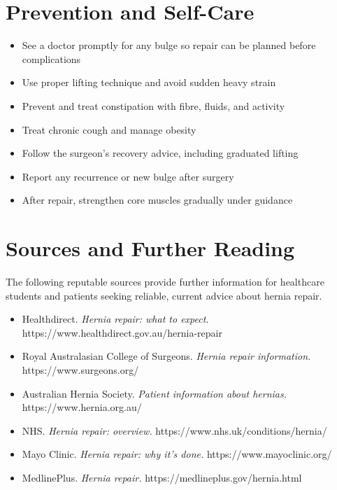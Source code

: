\section*{Prevention and Self-Care}
\begin{itemize}
    \item See a doctor promptly for any bulge so repair can be planned before complications
    \item Use proper lifting technique and avoid sudden heavy strain
    \item Prevent and treat constipation with fibre, fluids, and activity
    \item Treat chronic cough and manage obesity
    \item Follow the surgeon's recovery advice, including graduated lifting
    \item Report any recurrence or new bulge after surgery
    \item After repair, strengthen core muscles gradually under guidance
\end{itemize}

\section*{Sources and Further Reading}
The following reputable sources provide further information for healthcare students and patients seeking reliable, current advice about hernia repair.

\begin{itemize}
    \item Healthdirect. \textit{Hernia repair: what to expect.} https://www.healthdirect.gov.au/hernia-repair
    \item Royal Australasian College of Surgeons. \textit{Hernia repair information.} https://www.surgeons.org/
    \item Australian Hernia Society. \textit{Patient information about hernias.} https://www.hernia.org.au/
    \item NHS. \textit{Hernia repair: overview.} https://www.nhs.uk/conditions/hernia/
    \item Mayo Clinic. \textit{Hernia repair: why it's done.} https://www.mayoclinic.org/
    \item MedlinePlus. \textit{Hernia repair.} https://medlineplus.gov/hernia.html
\end{itemize}
